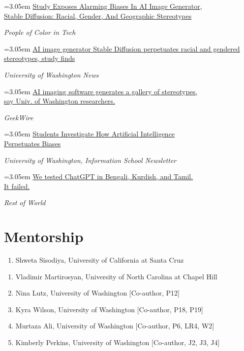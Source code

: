 \documentclass[10pt, letterpaper]{article}
\newcommand{\uwrow}[3]{%
  \noindent
  \begin{minipage}[t]{0.7\linewidth}
    \hangindent=3.05em\hangafter=1
    \raisebox{-2pt}{\uwbadge{#1}}\hspace{5pt}#2
  \end{minipage}%
  \hfill
  \begin{minipage}[t]{0.3\linewidth}\raggedleft
    \parbox[t]{\linewidth}{\raggedleft\textcolor{uwpurple}{\textit{\small #3}}}
  \end{minipage}\par
}
\begin{document}
\uwrow{2023}{\href{https://peopleofcolorintech.com/articles/study-exposes-alarming-biases-in-ai-image-generator-stable-diffusion-racial-gender-and-geographic-stereotypes/}{Study Exposes Alarming Biases In AI Image Generator, \\ Stable Diffusion: Racial, Gender, And Geographic Stereotypes}}{People of Color in Tech}
\uwrow{2023}{\href{https://www.washington.edu/news/2023/11/29/ai-image-generator-stable-diffusion-perpetuates-racial-and-gendered-stereotypes-bias/}{AI image generator Stable Diffusion perpetuates racial and gendered stereotypes, study finds}}{University of Washington News}
\uwrow{2023}{\href{https://www.geekwire.com/2023/ai-imaging-software-generates-a-gallery-of-stereotypes-say-univ-of-washington-researchers/}{AI imaging software generates a gallery of stereotypes, \\ say Univ. of Washington researchers.}}{GeekWire}
\uwrow{2023}{\href{https://ischool.uw.edu/news/2023/10/students-investigate-how-artificial-intelligence-perpetuates-biases?fbclid=IwAR2nyV0_RiuBVnutpGhnZucRD6e837bVYqHUDzKWWB4iV8KHhj6ltDHDF4A}{Students Investigate How Artificial Intelligence \\ Perpetuates Biases}}{\hfill University of Washington, \newline Information School Newsletter}
\uwrow{2023}{\href{https://restofworld.org/2023/chatgpt-problems-global-language-testing/}{We tested ChatGPT in Bengali, Kurdish, and Tamil. \\It failed.}}{Rest of World}
\newpage

\section{Mentorship}
\noindent{}\vspace{3pt}
\begin{enumerate}
    \item[] Shweta Sisodiya, University of California at Santa Cruz
\end{enumerate}
\vspace{5pt}

\noindent{}\vspace{3pt}
\begin{enumerate}
    \item[] Vladimir Martirosyan, University of North Carolina at Chapel Hill 
    \item[] Nina Lutz, University of Washington [Co-author, P12]
    \item[] Kyra Wilson, University of Washington [Co-author, P18, P19]
    \item[] Murtaza Ali, University of Washington [Co-author, P6, LR4, W2]
    \item[] Kimberly Perkins, University of Washington [Co-author, J2, J3, J4]
\end{enumerate}
\vspace{5pt}
\end{document}

